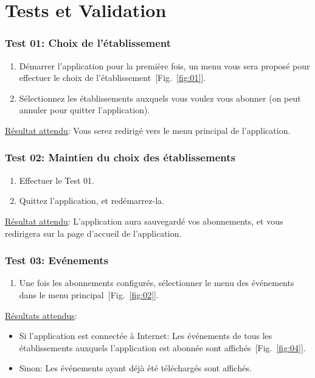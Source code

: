 \chapter{Tests et Validation}

 
  \subsection*{Test 01: Choix de l'établissement}
    \begin{enumerate}
    \item Démarrer l'application pour la première fois, un menu vous sera proposé pour effectuer le choix de l'établissement~[Fig.~\ref{fig:01}].
    \item Sélectionnez les établissements auxquels vous voulez vous abonner (on peut annuler pour quitter l'application).
    \end{enumerate}

    \underline{Résultat attendu}: Vous serez redirigé vers le menu principal de l'application.

  \subsection*{Test 02: Maintien du choix des établissements}
    \begin{enumerate}
    \item Effectuer le Test 01.
    \item Quittez l'application, et redémarrez-la.
    \end{enumerate}

    \underline{Résultat attendu}: L'application aura sauvegardé vos abonnements, et vous redirigera sur la page d'accueil de l'application.

  \subsection*{Test 03: Evénements}
    \begin{enumerate}
    \item Une fois les abonnements configurés, sélectionner le menu des événements dans le menu principal~[Fig.~\ref{fig:02}].
    \end{enumerate}

    \underline{Résultats attendus}:
    \begin{itemize}
    \item Si l'application est connectée à Internet: Les événements de tous les établissements auxquels l'application est abonnée sont affichés~[Fig.~\ref{fig:04}].
    \item Sinon: Les événements ayant déjà été téléchargés sont affichés.
    \end{itemize}

